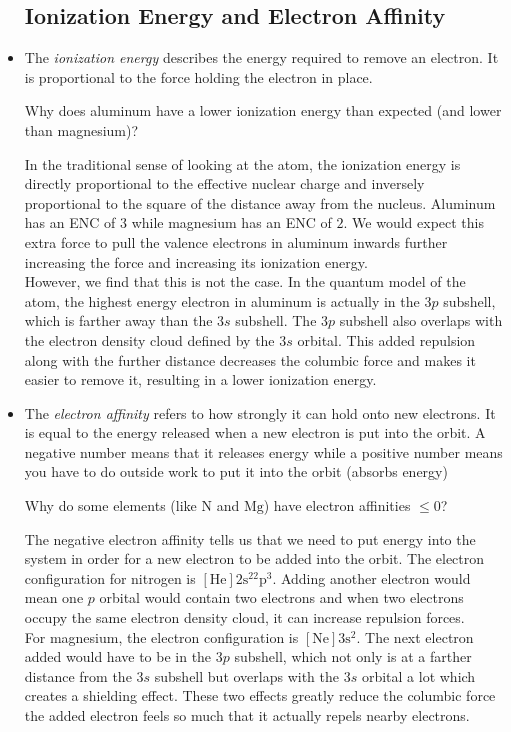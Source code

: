 \documentclass{article}
\begin{document}
\begin{itemize}
    \subsection{Ionization Energy and Electron Affinity}
    \item The \textit{ionization energy} describes the energy required to remove an electron. It is proportional to the force holding the electron in place.
    \begin{exampleQ}
        Why does aluminum have a lower ionization energy than expected (and lower than magnesium)?
    \end{exampleQ}
    \begin{exampleS}
        In the traditional sense of looking at the atom, the ionization energy is directly proportional to the effective nuclear charge and inversely proportional to the square of the distance away from the nucleus. Aluminum has an ENC of $3$ while magnesium has an ENC of $2$. We would expect this extra force to pull the valence electrons in aluminum inwards further increasing the force and increasing its ionization energy.\\

        However, we find that this is not the case. In the quantum model of the atom, the highest energy electron in aluminum is actually in the $3p$ subshell, which is farther away than the $3s$ subshell. The $3p$ subshell also overlaps with the electron density cloud defined by the $3s$ orbital. This added repulsion along with the further distance decreases the columbic force and makes it easier to remove it, resulting in a lower ionization energy.
    \end{exampleS}
    \item The \textit{electron affinity} refers to how strongly it can hold onto new electrons. It is equal to the energy released when a new electron is put into the orbit. A negative number means that it releases energy while a positive number means you have to do outside work to put it into the orbit (absorbs energy)
    \begin{exampleQ}
        Why do some elements (like $\mathrm{N}$ and $\mathrm{Mg}$) have electron affinities $\le 0$?
    \end{exampleQ}
    \begin{exampleS}
        The negative electron affinity tells us that we need to put energy into the system in order for a new electron to be added into the orbit. The electron configuration for nitrogen is $\mathrm{[He]2s^22p^3}$. Adding another electron would mean one $p$ orbital would contain two electrons and when two electrons occupy the same electron density cloud, it can increase repulsion forces. \\

        For magnesium, the electron configuration is $\mathrm{[Ne]3s^2}$. The next electron added would have to be in the $3p$ subshell, which not only is at a farther distance from the $3s$ subshell but overlaps with the $3s$ orbital a lot which creates a shielding effect. These two effects greatly reduce the columbic force the added electron feels so much that it actually repels nearby electrons.
    \end{exampleS}
\end{itemize}
\end{document}
